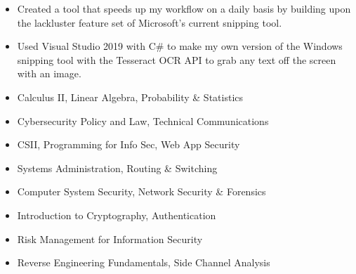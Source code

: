 \documentclass[10pt,a4paper,ragged2e]{altacv}
\begin{document}
\smallskip
\smallskip
{}
\begin{itemize}
\item Created a tool that speeds up my workflow on a daily basis by building upon the lackluster feature set of Microsoft's current snipping tool.
\smallskip
\item Used Visual Studio 2019 with C\# to make my own version of the Windows snipping tool with the Tesseract OCR API to grab any text off the screen with an image.
\end{itemize}
\smallskip
\smallskip


\smallskip
\begin{itemize}
\item Calculus II, Linear Algebra, Probability \& Statistics
\smallskip
\item Cybersecurity Policy and Law, Technical Communications
\smallskip
\item CSII, Programming for Info Sec, Web App Security
\smallskip
\item Systems Administration, Routing \& Switching
\smallskip
\item Computer System Security, Network Security \& Forensics
\smallskip
\item Introduction to Cryptography, Authentication
\smallskip
\item Risk Management for Information Security
\smallskip
\item Reverse Engineering Fundamentals, Side Channel Analysis
\smallskip
\end{itemize}



\end{document}
